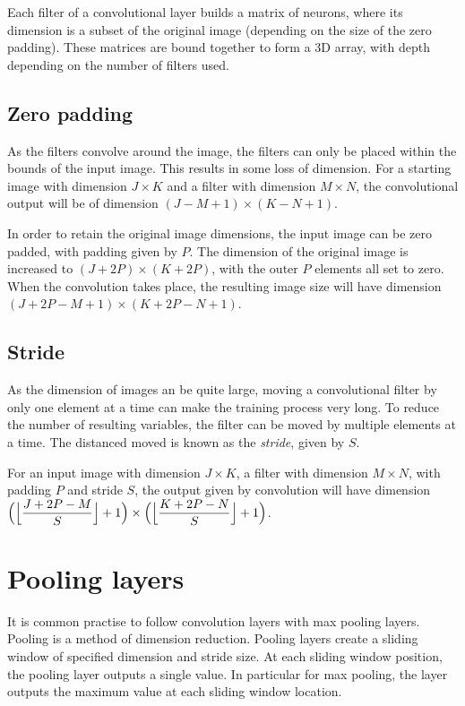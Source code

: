 Each filter of a convolutional layer builds a matrix of neurons, where its dimension is a subset of the original image (depending on the size of the zero padding). These matrices are bound together to form a 3D array, with depth depending on the number of filters used.

\subsection*{Zero padding}\label{convnets-pad}

As the filters convolve around the image, the filters can only be placed within the bounds of the input image. This results in some loss of dimension. For a starting image with dimension $J \times K$ and a filter with dimension $M \times N$, the convolutional output will be of dimension $(J - M + 1)\times (K - N + 1)$.

In order to retain the original image dimensions, the input image can be zero padded, with padding given by $P$. The dimension of the original image is increased to $(J+2P) \times (K+2P)$, with the outer $P$ elements all set to zero. When the convolution takes place, the resulting image size will have dimension $(J+2P - M + 1) \times (K + 2P - N + 1)$.

\subsection*{Stride}\label{convnets-stride}

As the dimension of images an be quite large, moving a convolutional filter by only one element at a time can make the training process very long. To reduce the number of resulting variables, the filter can be moved by multiple elements at a time. The distanced moved is known as the \textit{stride}, given by $S$.

For an input image with dimension $J \times K$, a filter with dimension $M \times N$, with padding $P$ and stride $S$, the output given by convolution will have dimension $\Big(\Bigl\lfloor \dfrac{J + 2P - M}{S}\Bigr\rfloor + 1\Big) \times \Big(\Bigl\lfloor \dfrac{K + 2P - N}{S} \Bigr\rfloor + 1\Big)$.

\section{Pooling layers}\label{convnets-pool}

It is common practise to follow convolution layers with max pooling layers. Pooling is a method of dimension reduction. Pooling layers create a sliding window of specified dimension and stride size. At each sliding window position, the pooling layer outputs a single value. In particular for max pooling, the layer outputs the maximum value at each sliding window location.

